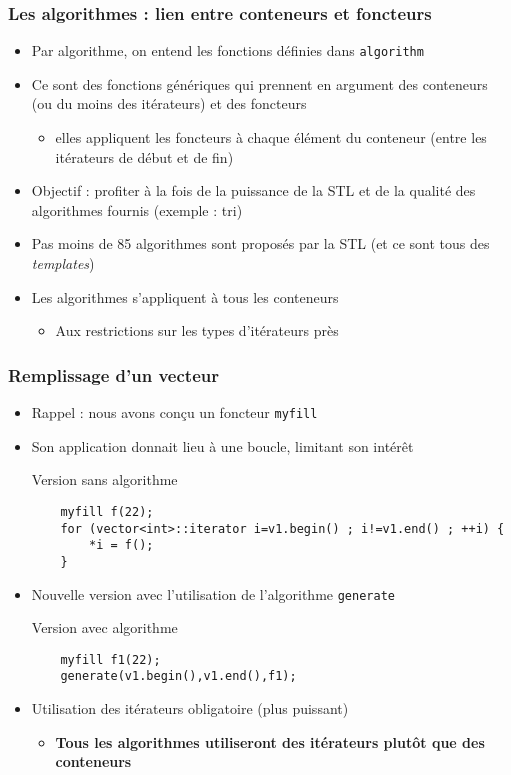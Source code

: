 \begin{frame}[fragile]\frametitle{Les algorithmes : lien entre conteneurs et foncteurs}

\begin{itemize}
\itemsep1pt\parskip0pt
\item
  Par algorithme, on entend les fonctions définies dans \verb|algorithm| 
\item
  Ce sont des fonctions génériques qui prennent en argument des
  conteneurs (ou du moins des itérateurs) et des foncteurs

  \begin{itemize}
  \itemsep1pt\parskip0pt
  \item
    elles appliquent les foncteurs à chaque élément du conteneur (entre
    les itérateurs de début et de fin)
  \end{itemize}
\item
  Objectif : profiter à la fois de la puissance de la STL et de la
  qualité des algorithmes fournis (exemple : tri)
\item Pas moins de 85 algorithmes sont proposés par la STL (et ce sont tous des \textit{templates})
\item Les algorithmes s'appliquent à tous les conteneurs
\begin{itemize}
\item Aux restrictions sur les types d'itérateurs près
\end{itemize}
\end{itemize}
\end{frame}

\begin{frame}[fragile]\frametitle{Remplissage d'un vecteur}
\begin{itemize}
\item Rappel : nous avons conçu un foncteur \verb|myfill|
\item Son application donnait lieu à une boucle, limitant son intérêt
\begin{codeblock}{Version sans algorithme}
\begin{lstlisting}
    myfill f(22);
    for (vector<int>::iterator i=v1.begin() ; i!=v1.end() ; ++i) {
        *i = f();
    }
\end{lstlisting}
\end{codeblock}
\item Nouvelle version avec l'utilisation de l'algorithme \verb|generate|
\begin{codeblock}{Version avec algorithme}
\begin{lstlisting}
    myfill f1(22);
    generate(v1.begin(),v1.end(),f1);
\end{lstlisting}
\end{codeblock}
\item Utilisation des itérateurs obligatoire (plus puissant)
\begin{itemize}
\item \textbf{Tous les algorithmes utiliseront des itérateurs plutôt que des conteneurs}
\end{itemize}
\end{itemize}
\end{frame}

